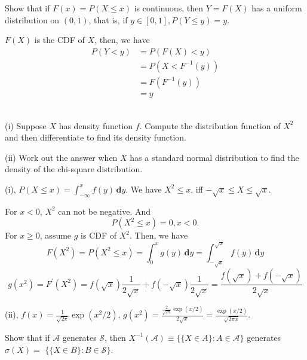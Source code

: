 \documentclass[en, normal, 11pt, black]{elegantnote}
\newenvironment{exercise}[1]{\begin{tcolorbox}[colback=black!15, colframe=black!80, breakable, title=#1]}{\end{tcolorbox}}
\renewenvironment{proof}{\begin{tcolorbox}[colback=white, colframe=black!50, breakable, title=Proof. ]\setlength{\parskip}{0.8em}}{\\\rightline{$\square$}\end{tcolorbox}}
\newenvironment{solution}{\begin{tcolorbox}[colback=white, colframe=black!50, breakable, title=Solution. ]\setlength{\parskip}{0.8em}}{\end{tcolorbox}}
\newcommand{\der}{\,\mathbf{d}}
\begin{document}
    \begin{exercise}{1.2.4}
        Show that if $F(x)=P(X \leq x)$ is continuous, then $Y=F(X)$ has a uniform distribution on $(0,1)$, that is, if $y \in[0,1], P(Y \leq y)=y$.
    \end{exercise}

    \begin{proof}
        $F(X)$ is the CDF of $X$, then, we have
        \begin{align*}
            P(Y<y)&=P(F(X)<y)\\
            &=P(X<F^{-1}(y))\\
            &=F(F^{-1}(y))\\
            &=y
        \end{align*}
        \vspace{-20pt}
    \end{proof}

    \begin{exercise}{1.2.7}
        (i) Suppose $X$ has density function $f$. Compute the distribution function of $X^{2}$ and then differentiate to find its density function. 
        
        (ii) Work out the answer when $X$ has a standard normal distribution to find the density of the chi-square distribution. 
    \end{exercise}

    \begin{solution}
        (i), $P(X\leqslant x)=\int_{-\infty}^xf(y)\der y$. We have $X^2\leqslant x$, iff $-\sqrt{x}\leqslant X \leqslant \sqrt{x}$. 
        
        For $x<0$, $X^2$ can not be negative. And
        \[P(X^2\leqslant x)=0, x<0.\]
        For $x\geqslant 0$, assume $g$ is CDF of $X^2$. Then, we have
        \[F(X^2)=P(X^2\leqslant x)=\int_0^x g(y)\der y=\int_{-\sqrt{x}}^{\sqrt{x}}f(y)\der y\]
        \[g(x^2)=F^\prime(X^2)=f(\sqrt{x})\frac{1}{2\sqrt{x}}+f(-\sqrt{x})\frac{1}{2\sqrt{x}}=\frac{f(\sqrt{x})+f(-\sqrt{x})}{2\sqrt{x}}\]

        (ii), $f(x)=\frac{1}{\sqrt{2\pi}}\exp(x^2/2)$, $g(x^2)=\frac{\frac{2}{\sqrt{2\pi}}\exp(x/2)}{2\sqrt{x}}=\frac{\exp(x/2)}{\sqrt{2\pi x}}$. 
    \end{solution}

    \begin{exercise}{1.3.1}
        Show that if $\mathcal{A}$ generates $\mathcal{S}$, then $X^{-1}(\mathcal{A}) \equiv\{\{X \in A\}: A \in \mathcal{A}\}$ generates $\sigma(X)=$ $\{\{X \in B\}: B \in \mathcal{S}\}$. 
    \end{exercise}
\end{document}
